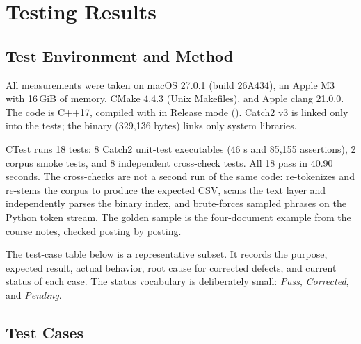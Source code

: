 %

\newpage
\section{Testing Results}
\label{sec:results}

\subsection{Test Environment and Method}
\label{sec:test-method}

All measurements were taken on macOS 27.0.1 (build 26A434), an Apple M3 with
16\,GiB of memory, CMake 4.4.3 (Unix Makefiles), and Apple clang 21.0.0. The
code is C++17, compiled with  in Release mode
(). Catch2 v3 is linked only into the tests; the
 binary (329,136 bytes) links only system libraries.

CTest runs 18 tests: 8 Catch2 unit-test executables (46 s and
85,155 assertions), 2 corpus smoke tests, and 8 independent cross-check tests.
All 18 pass in 40.90 seconds. The cross-checks are not a second run of the same
code:  re-tokenizes and re-stems the corpus to
produce the expected CSV,  scans the text layer and
independently parses the binary index, and 
brute-forces sampled phrases on the Python token stream. The golden sample is
the four-document example from the course notes, checked posting by posting.

The test-case table below is a representative subset. It records the purpose,
expected result, actual behavior, root cause for corrected defects, and current
status of each case. The status vocabulary is deliberately small: \emph{Pass},
\emph{Corrected}, and \emph{Pending}.

\subsection{Test Cases}
\label{sec:test-cases}


